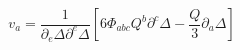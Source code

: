 \begin{equation}
  \label{eq:final}
 v_a= \frac1{\partial_e \Delta \partial^e \Delta}
\left[ 6 \Phi_{abc}Q^b\partial^c\Delta -\frac Q3 \partial_a \Delta\right]
\end{equation}

